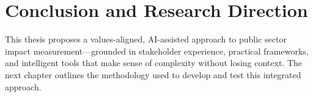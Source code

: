\section{Conclusion and Research Direction}\label{sec:conclusion-and-research-direction}


This thesis proposes a values-aligned, AI-assisted approach to public sector impact measurement—grounded in stakeholder experience, practical frameworks, and intelligent tools that make sense of complexity without losing context.
The next chapter outlines the methodology used to develop and test this integrated approach.
